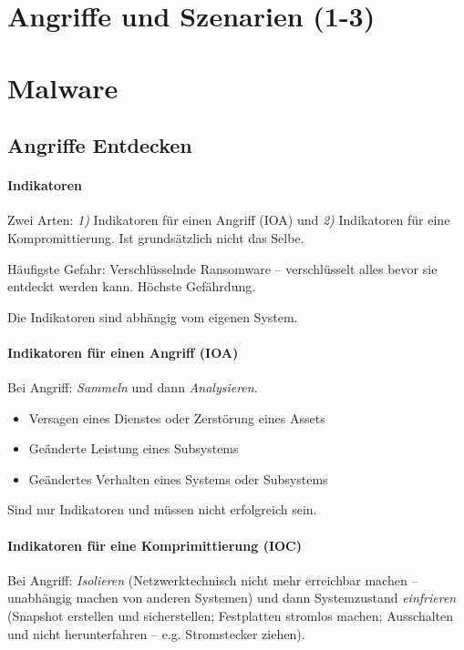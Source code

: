 \documentclass[a4paper,12pt]{article}
\begin{document}
\newpage
\section{Angriffe und Szenarien (1-3)}

\newpage
\section{Malware}

\subsection{Angriffe Entdecken}

\paragraph{Indikatoren} Zwei Arten: \emph{1)} Indikatoren für einen Angriff (IOA) und \emph{2)} Indikatoren für eine Kompromittierung.
Ist grundsätzlich nicht das Selbe.

Häufigste Gefahr: Verschlüsselnde Ransomware -- verschlüsselt alles bevor sie entdeckt werden kann. Höchste Gefährdung. 

Die Indikatoren sind abhängig vom eigenen System. 

\paragraph{Indikatoren für einen Angriff (IOA)}
Bei Angriff: \emph{Sammeln} und dann \emph{Analysieren}.

\begin{itemize}
\item Versagen eines Dienstes oder Zerstörung eines Assets
\item Geänderte Leistung eines Subsystems
\item Geändertes Verhalten eines Systems oder Subsystems
\end{itemize}

Sind nur Indikatoren und müssen nicht erfolgreich sein.

\paragraph{Indikatoren für eine Komprimittierung (IOC)}
Bei Angriff: \emph{Isolieren} (Netzwerktechnisch nicht mehr erreichbar machen -- unabhängig machen von anderen Systemen) und dann Systemzustand \emph{einfrieren} (Snapshot erstellen und sicherstellen; Festplatten stromlos machen; Ausschalten und nicht herunterfahren -- e.g. Stromstecker ziehen).
\end{document}
